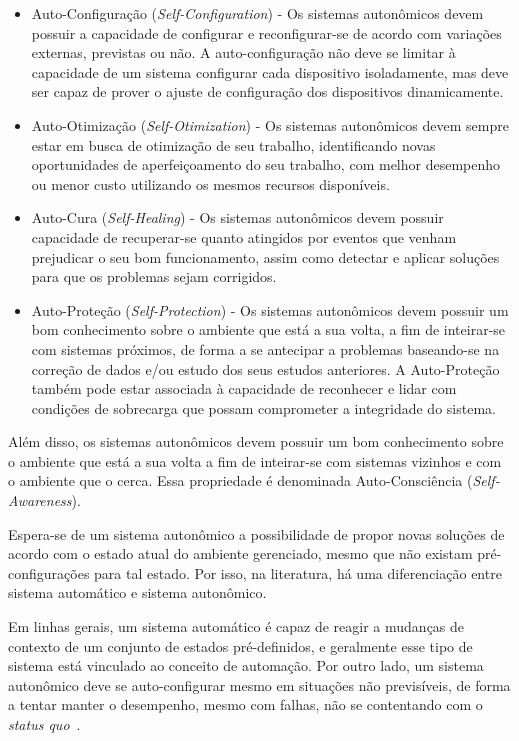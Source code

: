 \documentclass[11pt,twoside]{article}
\begin{document}
\begin{itemize}

\item Auto-Configuração (\textit{Self-Configuration}) - Os sistemas autonômicos devem possuir a capacidade de configurar e reconfigurar-se de acordo com variações externas, previstas ou não. A auto-configuração não deve se limitar à capacidade de um sistema configurar cada dispositivo isoladamente, mas deve ser capaz de prover o ajuste de configuração dos dispositivos dinamicamente.

\item Auto-Otimização (\textit{Self-Otimization}) - Os sistemas autonômicos devem sempre estar em busca de otimização de seu trabalho, identificando novas oportunidades de aperfeiçoamento do seu trabalho, com melhor desempenho ou menor custo utilizando os mesmos recursos disponíveis.

\item Auto-Cura (\textit{Self-Healing}) - Os sistemas autonômicos devem possuir capacidade de recuperar-se quanto atingidos por eventos que venham prejudicar o seu bom funcionamento, assim como detectar e aplicar soluções para que os problemas sejam corrigidos. 

\item Auto-Proteção (\textit{Self-Protection}) - Os sistemas autonômicos devem possuir um bom conhecimento sobre o ambiente que está a sua volta, a fim de inteirar-se com sistemas próximos, de forma a se antecipar a problemas baseando-se na correção de dados e/ou estudo dos seus estudos anteriores. A Auto-Proteção também pode estar associada à capacidade de reconhecer e lidar com condições de sobrecarga que possam comprometer a integridade do sistema.
\end{itemize}

Além disso, os sistemas autonômicos devem possuir um bom conhecimento sobre o ambiente que está a sua volta a fim de inteirar-se com sistemas vizinhos e com o ambiente que o cerca. Essa propriedade é denominada Auto-Consciência (\textit{Self-Awareness}).

Espera-se de um sistema autonômico a possibilidade de propor novas soluções de acordo com o estado atual do ambiente gerenciado, mesmo que não existam pré-configurações para tal estado. Por isso, na literatura, há uma diferenciação entre sistema automático e sistema autonômico. 

Em linhas gerais, um sistema automático é capaz de reagir a mudanças de contexto de um conjunto de estados pré-definidos, e geralmente esse tipo de sistema está vinculado ao conceito de automação. Por outro lado, um sistema autonômico deve se auto-configurar mesmo em situações não previsíveis, de forma a tentar manter o desempenho, mesmo com falhas, não se contentando com o \textit{status quo}~\cite{GANEK}.
\end{document}

